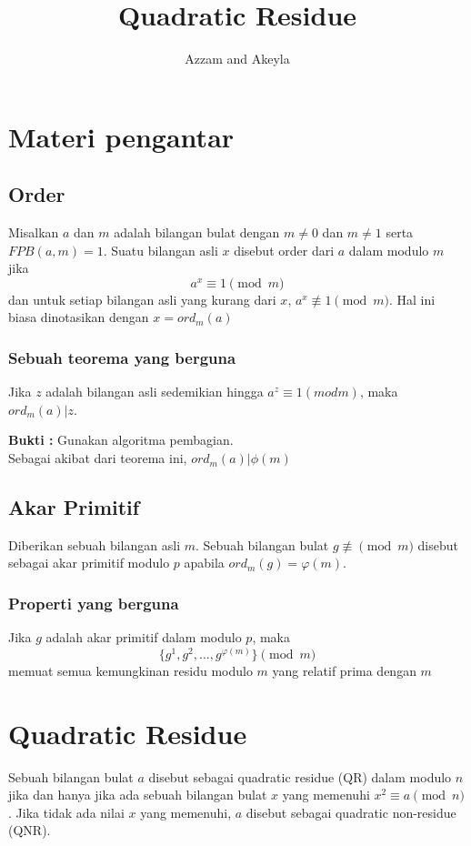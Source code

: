 \documentclass[11pt]{scrartcl}
\title{Quadratic Residue}
\author{Azzam and Akeyla}
\begin{document}
\maketitle

\renewcommand*\contentsname{Daftar Isi}
\tableofcontents

\newpage

\section{Materi pengantar}
\subsection{Order}
Misalkan $a$ dan $m$ adalah bilangan bulat dengan $m \neq 0$ dan $m \neq 1$ serta $FPB(a,m) = 1$. Suatu bilangan asli $x$ disebut order dari $a$ dalam modulo $m$ jika $$a^x \equiv 1 \pmod{m}$$ dan untuk setiap bilangan asli yang kurang dari $x$, $a^x \not\equiv 1 \pmod{m}$. Hal ini biasa dinotasikan dengan $x = ord_m(a)$
\subsubsection{Sebuah teorema yang berguna}
\begin{theorem}
    Jika $z$ adalah bilangan asli sedemikian hingga $a^z \equiv 1 (mod m)$, maka $ord_m(a) | z$.
\end{theorem}
\textbf{Bukti :} Gunakan algoritma pembagian.\\
Sebagai akibat dari teorema ini, $ord_m(a) | \phi(m)$


\subsection{Akar Primitif}
Diberikan sebuah bilangan asli $m$. Sebuah bilangan bulat $g \not\equiv \pmod{m}$ disebut sebagai akar primitif modulo $p$ apabila $ord_m(g) = \varphi(m)$.
\subsubsection{Properti yang berguna}
Jika $g$ adalah akar primitif dalam modulo $p$, maka \[\{g^1, g^2, ..., g^{\varphi(m)}\} \pmod{m}\] memuat semua kemungkinan residu modulo $m$ yang relatif prima dengan $m$

\section{Quadratic Residue}
Sebuah bilangan bulat $a$ disebut sebagai quadratic residue (QR) dalam modulo $n$ jika dan hanya jika ada sebuah bilangan bulat $x$ yang memenuhi $x^2 \equiv a \pmod{n}$. Jika tidak ada nilai $x$ yang memenuhi, $a$ disebut sebagai quadratic non-residue (QNR).
\end{document}
